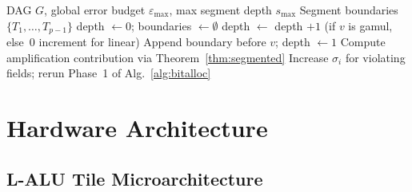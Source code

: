 \documentclass[11pt,a4paper]{article}
\theoremstyle{definition}
\theoremstyle{plain}
\theoremstyle{remark}
\begin{document}
\begin{algorithm}[H]
\caption{Greedy Segmentation}
\label{alg:segment}
\begin{algorithmic}[1]
\REQUIRE DAG $G$, global error budget $\varepsilon_\mathrm{max}$,
         max segment depth $s_\mathrm{max}$
\ENSURE Segment boundaries $\{T_1,\ldots,T_{p-1}\}$
\STATE depth $\leftarrow 0$; boundaries $\leftarrow \emptyset$
  \STATE depth $\leftarrow$ depth $+ 1$ (if $v$ is gamul, else~0 increment for linear)
    \STATE Append boundary before $v$; depth $\leftarrow 1$
    \STATE Compute amplification contribution via Theorem~\ref{thm:segmented}
      \STATE Increase $\sigma_i$ for violating fields; rerun Phase~1 of Alg.~\ref{alg:bitalloc}
    \ENDIF
  \ENDIF
\ENDFOR
\end{algorithmic}
\end{algorithm}

\section{Hardware Architecture}
\label{sec:hw}

\subsection{L-ALU Tile Microarchitecture}
\end{document}
